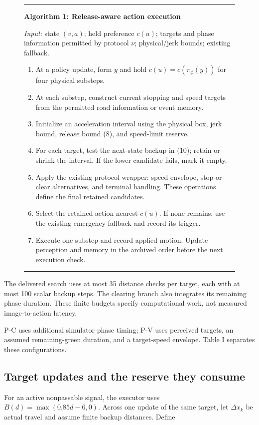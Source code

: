 \documentclass[letterpaper,journal]{IEEEtran}
\begin{document}
\begin{figure}[!t]
\hrule\smallskip
\textbf{Algorithm 1: Release-aware action execution}
\smallskip

\textit{Input:} state $(v,a)$; held preference $c(u)$; targets and phase information permitted by protocol $\nu$; physical/jerk bounds; existing fallback.
\begin{enumerate}
\setlength{\itemsep}{2pt}\setlength{\parsep}{0pt}
\item At a policy update, form $y$ and hold $c(u)=c(\pi_\phi(y))$ for four physical substeps.
\item At each substep, construct current stopping and speed targets from the permitted road information or event memory.
\item Initialize an acceleration interval using the physical box, jerk bound, release bound (8), and speed-limit reserve.
\item For each target, test the next-state backup in (10); retain or shrink the interval. If the lower candidate fails, mark it empty.
\item Apply the existing protocol wrapper: speed envelope, stop-or-clear alternatives, and terminal handling. These operations define the final retained candidates.
\item Select the retained action nearest $c(u)$. If none remains, use the existing emergency fallback and record its trigger.
\item Execute one substep and record applied motion. Update perception and memory in the archived order before the next execution check.
\end{enumerate}
\smallskip\hrule
\end{figure}

The delivered search uses at most 35 distance checks per target, each with at most 100 scalar backup steps. The clearing branch also integrates its remaining phase duration. These finite budgets specify computational work, not measured image-to-action latency.

P-C uses additional simulator phase timing; P-V uses perceived targets, an assumed remaining-green duration, and a target-speed envelope. Table I separates these configurations.

\subsection{Target updates and the reserve they consume}

For an active nonpassable signal, the executor uses \(B(d)=\max(0.85d-6,0)\). Across one update of the same target, let \(\Delta x_k\) be actual travel and assume finite backup distances. Define
\end{document}

